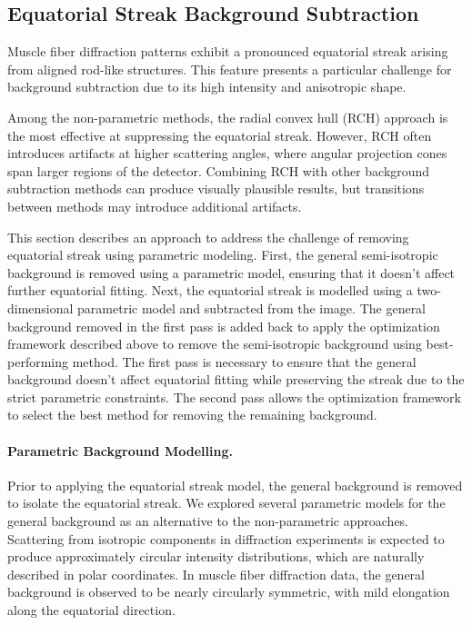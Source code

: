 \documentclass[iucr]{iucrjournals}
\begin{document}
\subsection{Equatorial Streak Background Subtraction}

Muscle fiber diffraction patterns exhibit a pronounced equatorial streak arising from aligned rod-like structures. This feature presents a particular challenge for background subtraction due to its high intensity and anisotropic shape. 

Among the non-parametric methods, the radial convex hull (RCH) approach is the most effective at suppressing the equatorial streak. However, RCH often introduces artifacts at higher scattering angles, where angular projection cones span larger regions of the detector. Combining RCH with other background subtraction methods can produce visually plausible results, but transitions between methods may introduce additional artifacts.

This section describes an approach to address the challenge of removing equatorial streak using parametric modeling. First, the general semi-isotropic background is removed using a parametric model, ensuring that it doesn't affect further equatorial fitting. Next, the equatorial streak is modelled using a two-dimensional parametric model and subtracted from the image. The general background removed in the first pass is added back to apply the optimization framework described above to remove the semi-isotropic background using best-performing method. The first pass is necessary to ensure that the general background doesn't affect equatorial fitting while preserving the streak due to the strict parametric constraints. The second pass allows the optimization framework to select the best method for removing the remaining background.


\paragraph{Parametric Background Modelling.}

Prior to applying the equatorial streak model, the general background is removed to isolate the equatorial streak. We explored several parametric models for the general background as an alternative to the non-parametric approaches. Scattering from isotropic components in diffraction experiments is expected to produce approximately circular intensity distributions, which are naturally described in polar coordinates. In muscle fiber diffraction data, the general background is observed to be nearly circularly symmetric, with mild elongation along the equatorial direction.
\end{document}
